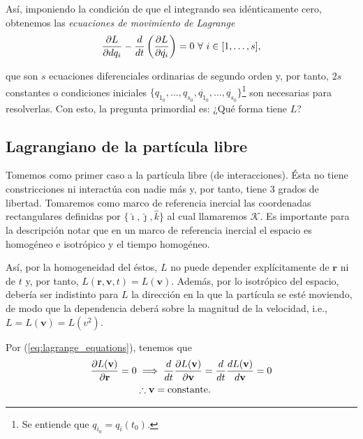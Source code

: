 Así, imponiendo la condición de que el integrando sea idénticamente cero, obtenemos las \textit{ecuaciones de movimiento de Lagrange}
\begin{equation}
 \frac{\partial L}{\partial d q_i} - \frac{d}{dt} \left( \frac{\partial L}{\partial  \dot{q_i} } \right) = 0 \ \forall \ i \in [1, \ldots, s],
 \label{eq:lagrange_equations}
\end{equation}

que son $s$ ecuaciones diferenciales ordinarias de segundo orden y, por tanto, $2s$ constantes o condiciones iniciales $\{ q_{1_0}, \ldots, q_{s_0}, \dot{q_{1_0}}, \ldots, \dot{q_{s_0}} \}$\footnote{Se entiende que $q_{i_0} = q_i(t_0)$.} son necesarias para resolverlas. Con esto, la pregunta primordial es: ¿Qué forma tiene $L$?

\subsection{Lagrangiano de la partícula libre}

Tomemos como primer caso a la partícula libre (de interacciones). Ésta no tiene constricciones ni interactúa con nadie más y, por tanto, tiene 3 grados de libertad. Tomaremos como marco de referencia inercial las coordenadas rectangulares definidas por $\{ \hat{\imath}, \hat{\jmath}, \hat{k} \}$ al cual llamaremos $\mathcal{K}$. Es importante para la descripción notar que en un marco de referencia inercial el espacio es homogéneo e isotrópico y el tiempo homogéneo. 

Así, por la homogeneidad del éstos, $L$ no puede depender explícitamente de $\mathbf{r}$ ni de $t$ y, por tanto, $L(\mathbf{r},\mathbf{v},t) = L(\mathbf{v})$. Además, por lo isotrópico del espacio, debería ser indistinto para $L$ la dirección en la que la partícula se esté moviendo, de modo que la dependencia deberá sobre la magnitud de la velocidad, i.e., $L = L(\mathbf{v}) = L(v^2)$.

Por (\ref{eq:lagrange_equations}), tenemos que 
 \begin{align*}
 \frac{\partial L(\mathbf{v}) }{\partial  \mathbf{r} } = 0 &\implies \frac{d}{dt}\frac{\partial L(\mathbf{v})}{\partial \mathbf{v}} = \frac{d}{dt} \frac{dL(\mathbf{v})}{d\mathbf{v}} = 0 \\ 
 &\therefore \mathbf{v} = \text{constante}.
 \end{align*}


